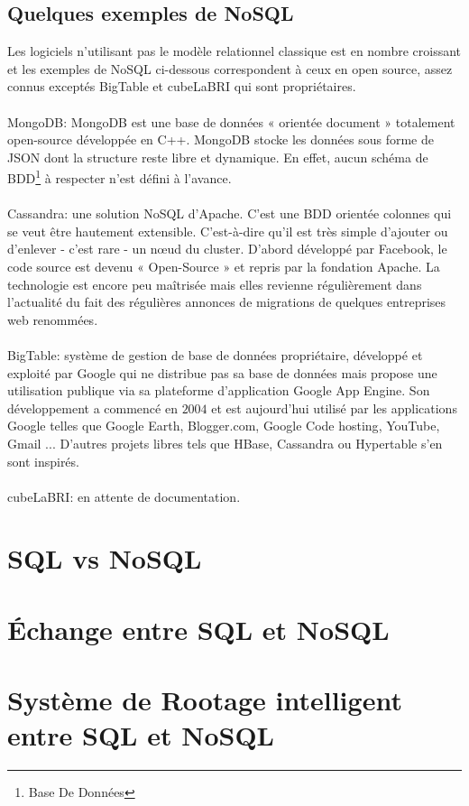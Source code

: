 \subsection{Quelques exemples de \textsf{NoSQL}}

Les logiciels n'utilisant pas le modèle relationnel classique est en
nombre croissant et les exemples de \textsf{NoSQL} ci-dessous correspondent à ceux en open source, assez connus exceptés
\textsf{BigTable} et \textsf{cubeLaBRI} qui sont propriétaires.
\\\\ {\sf MongoDB}: MongoDB est une base de données « \textsf{orientée
    document} » totalement open-source développée en
\textsf{C++}. MongoDB stocke les données sous forme de \textsf{JSON}
dont la structure reste libre et dynamique.  En effet, aucun schéma de
\textsf{BDD}\footnote{Base De Données} à respecter n'est défini à
l'avance.\cite{mongoDB} \\\\ \textsf{Cassandra}:  une
solution \textsf{NoSQL} d’\textsf{Apache}.  C’est une \textsf{BDD} orientée colonnes
qui se veut être hautement extensible. C’est-à-dire qu’il est très
simple d’ajouter ou d’enlever - c’est rare - un nœud du
cluster. D’abord développé par \textsf{Facebook}, le code source est devenu
« \textsf{Open-Source} » et repris par la fondation \textsf{Apache}\cite{cassandra}.  La
technologie est encore peu maîtrisée mais elles revienne régulièrement
dans l’actualité du fait des régulières annonces de migrations de
quelques entreprises \textsf{web} renommées\cite{cassandra2}.
\\\\ \textsf{BigTable}:  système de gestion de base de
données propriétaire, développé et exploité par Google qui ne
distribue pas sa base de données mais propose une utilisation publique
via sa plateforme d'application \textsf{Google App Engine}. Son
développement a commencé en $2004$ et est aujourd'hui utilisé par les
applications \textsf{Google} telles que \textsf{Google Earth},
\textsf{Blogger.com}, \textsf{Google Code hosting}, \textsf{YouTube},
\textsf{Gmail} ... D'autres projets libres tels que \textsf{HBase},
\textsf{Cassandra} ou \textsf{Hypertable} s'en sont
inspirés.\cite{bigtable} \\\\ {\color{red} \textsf{cubeLaBRI}: en
  attente de documentation.}

\section{\textsf{SQL} vs \textsf{NoSQL}}


\section{Échange entre \textsf{SQL} et \textsf{NoSQL}}


\section{Système de Rootage intelligent entre \textsf{SQL} et \textsf{NoSQL}}

